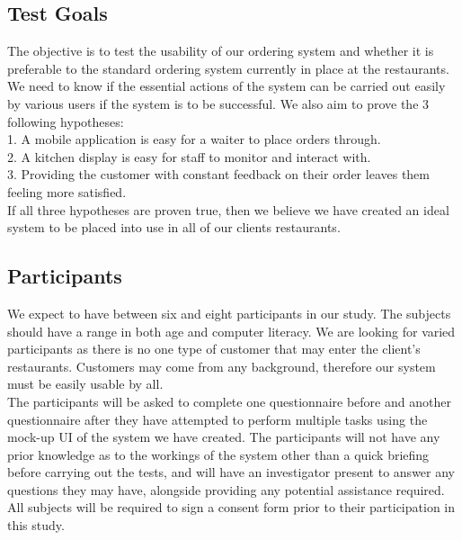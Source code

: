 \documentclass[11pt, a4paper]{report}
\begin{document}
\subsection{Test Goals} 
The   objective   is   to   test   the   usability   of   our   ordering   system   and   whether   it   is preferable   to   the   standard   ordering   system   currently   in   place   at   the   restaurants.   We need   to   know   if   the   essential   actions   of   the   system   can   be   carried   out   easily   by various   users   if   the   system   is   to   be   successful.   We   also   aim   to   prove   the   3   following hypotheses:\\
1. A   mobile   application   is   easy   for   a   waiter   to   place   orders   through.\\
2. A   kitchen   display   is   easy   for   staff   to   monitor   and   interact   with.\\
3. Providing   the   customer   with   constant   feedback   on   their   order   leaves   them
feeling   more   satisfied.\\
If   all   three   hypotheses   are   proven   true,   then   we   believe   we   have   created   an   ideal system   to   be   placed   into   use   in   all   of   our   clients   restaurants.\\
\subsection{Participants} 
We   expect   to   have   between   six   and   eight   participants   in   our   study.   The   subjects should   have   a   range   in   both   age   and   computer   literacy.   We   are   looking   for   varied participants   as   there   is   no   one   type   of   customer   that   may   enter   the   client’s restaurants.   Customers   may   come   from   any   background,   therefore   our   system must   be   easily   usable   by   all.\\
The   participants   will   be   asked   to   complete   one   questionnaire   before   and   another questionnaire   after   they   have   attempted   to   perform   multiple   tasks   using   the mock-up   UI   of   the   system   we   have   created.   The   participants   will   not   have   any   prior knowledge   as   to   the   workings   of   the   system   other   than   a   quick   briefing   before carrying   out   the   tests,   and   will   have   an   investigator   present   to   answer   any questions   they   may   have,   alongside   providing   any   potential   assistance   required.   All subjects   will   be   required   to   sign   a   consent   form   prior   to   their   participation   in   this study.\\
\end{document}
